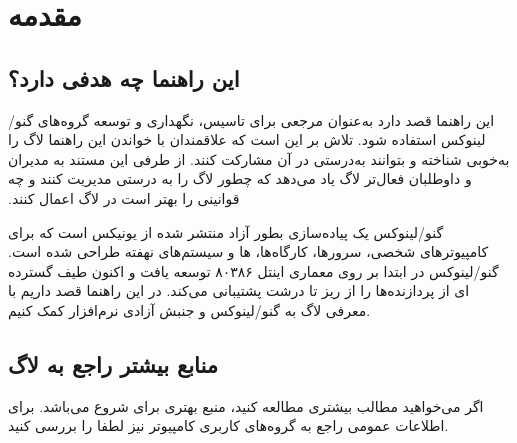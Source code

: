 \section{مقدمه}

\subsection{این راهنما چه هدفی دارد؟}

این راهنما قصد دارد به‌عنوان مرجعی برای تاسیس، نگهداری و توسعه گروه‌های گنو/لینوکس استفاده شود.
تلاش بر این است که علاقمندان با خواندن این راهنما لاگ را ‫به‌خوبی شناخته و بتوانند به‌درستی در آن
مشارکت کنند. از طرفی این مستند به مدیران و داوطلبان فعال‌تر لاگ یاد می‌دهد که چطور لاگ را به درستی
مدیریت کنند و چه قوانینی را بهتر است در لاگ اعمال کنند.

گنو/لینوکس یک پیاده‌سازی بطور آزاد منتشر شده از یونیکس است که برای کامپیوترهای شخصی،
سرورها، کارگاه‌ها،
ها
و سیستم‌های نهفته طراحی شده است.
گنو/لینوکس در ابتدا بر روی معماری اینتل ۸۰۳۸۶ توسعه یافت و اکنون طیف گسترده ای از پردازنده‌ها
را از ریز تا درشت پشتیبانی می‌کند. در این راهنما قصد داریم با معرفی لاگ به گنو/لینوکس و جنبش
آزادی نرم‌افزار کمک کنیم.

%

\subsection{منابع بیشتر راجع به لاگ}

اگر می‌خواهید مطالب بیشتری مطالعه کنید،
منبع بهتری برای شروع می‌باشد. برای اطلاعات عمومی راجع به گروه‌های کاربری کامپیوتر نیز لطفا
را بررسی کنید.


